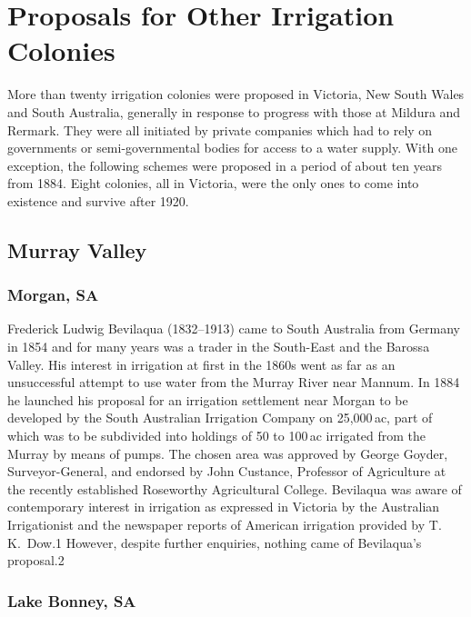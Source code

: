
\chapter{Proposals for Other Irrigation Colonies}

More than twenty irrigation colonies were proposed in Victoria, New
South Wales and South Australia, generally in response to progress
with those at Mildura and Rermark.  They were all initiated by private
companies which had to rely on governments or semi-governmental bodies
for access to a water supply. With one exception, the following
schemes were proposed in a period of about ten years from 1884.  Eight
colonies, all in Victoria, were the only ones to come into existence
and survive after 1920.

\section{Murray Valley}

\subsection{Morgan, SA}

Frederick Ludwig Bevilaqua (1832--1913) came to South Australia from
Germany in 1854 and for many years was a trader in the South-East and
the Barossa Valley.  His interest in irrigation at first in the 1860s
went as far as an unsuccessful attempt to use water from the Murray
River near Mannum.  In 1884 he launched his proposal for an irrigation
settlement near Morgan to be developed by the South Australian
Irrigation Company on 25,000\,ac, part of which was to be subdivided
into holdings of 50 to 100\,ac irrigated from the Murray by means of
pumps.  The chosen area was approved by George Goyder,
Surveyor-General, and endorsed by John Custance, Professor of
Agriculture at the recently established Roseworthy Agricultural
College.  Bevilaqua was aware of contemporary interest in irrigation
as expressed in Victoria by the Australian Irrigationist and the
newspaper reports of American irrigation provided by T.\,K.~Dow.1
However, despite further enquiries, nothing came of Bevilaqua's
proposal.2

\subsection{Lake Bonney, SA}

